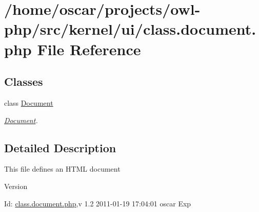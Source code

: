 \section{/home/oscar/projects/owl-\/php/src/kernel/ui/class.document.php File Reference}
\label{class_8document_8php}
\subsection*{Classes}
\begin{DoxyCompactItemize}
\item 
class \hyperlink{classDocument}{Document}
\begin{DoxyCompactList}\small\item\em \hyperlink{classDocument}{Document}. \item\end{DoxyCompactList}\end{DoxyCompactItemize}


\subsection{Detailed Description}
This file defines an HTML document \begin{DoxyVersion}{Version}

\end{DoxyVersion}
\begin{DoxyParagraph}{Id:}
\hyperlink{class_8document_8php}{class.document.php},v 1.2 2011-\/01-\/19 17:04:01 oscar Exp 
\end{DoxyParagraph}
